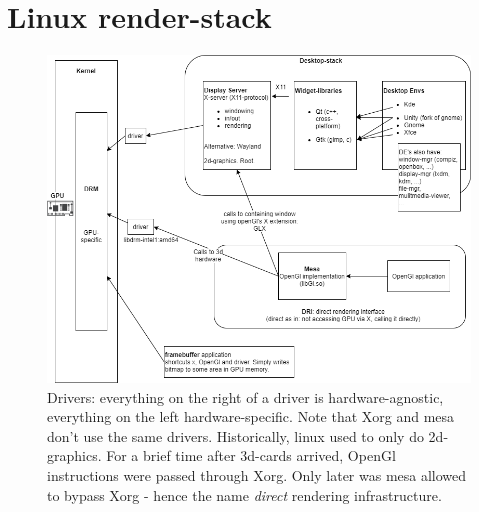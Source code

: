 \section{Linux render-stack}


\begin{figure}[H] \label{render-stack}
    \caption{Drivers: everything on the right of a driver is hardware-agnostic, everything on the left hardware-specific. Note that Xorg and mesa don't use the same drivers. 
    Historically, linux used to only do 2d-graphics. For a brief time after 3d-cards arrived, OpenGl instructions were passed through Xorg. Only later was mesa allowed to bypass Xorg - 
    hence the name \emph{direct} rendering infrastructure.}
    \centering
    \includegraphics[width=0.8\linewidth]{images/render-stack.png}
\end{figure}


